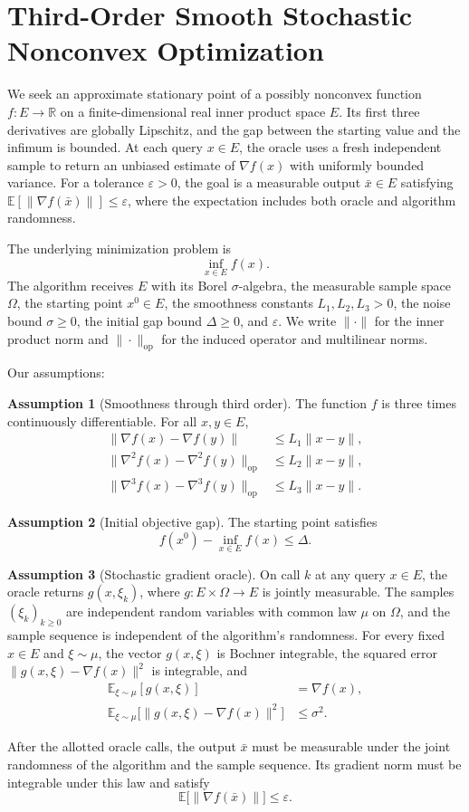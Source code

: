 \documentclass[10pt]{article}
\theoremstyle{definition}
\newtheorem{assumption}{Assumption}
\begin{document}
\section*{Third-Order Smooth Stochastic Nonconvex Optimization}
We seek an approximate stationary point of a possibly nonconvex function $f:E\to\mathbb{R}$ on a finite-dimensional real inner product space $E$. Its first three derivatives are globally Lipschitz, and the gap between the starting value and the infimum is bounded. At each query $x\in E$, the oracle uses a fresh independent sample to return an unbiased estimate of $\nabla f(x)$ with uniformly bounded variance. For a tolerance $\varepsilon>0$, the goal is a measurable output $\bar{x}\in E$ satisfying $\mathbb{E}[\|\nabla f(\bar{x})\|]\leq\varepsilon$, where the expectation includes both oracle and algorithm randomness.

The underlying minimization problem is
\[
\inf_{x\in E} f(x).
\]
The algorithm receives $E$ with its Borel $\sigma$-algebra, the measurable sample space $\Omega$, the starting point $x^0\in E$, the smoothness constants $L_1,L_2,L_3>0$, the noise bound $\sigma\geq 0$, the initial gap bound $\Delta\geq 0$, and $\varepsilon$. We write $\|\cdot\|$ for the inner product norm and $\|\cdot\|_{\mathrm{op}}$ for the induced operator and multilinear norms.

Our assumptions:
\begin{assumption}[Smoothness through third order]
The function $f$ is three times continuously differentiable. For all $x,y\in E$,
\[
\begin{aligned}
\|\nabla f(x)-\nabla f(y)\| &\leq L_1\|x-y\|,\\
\|\nabla^2 f(x)-\nabla^2 f(y)\|_{\mathrm{op}} &\leq L_2\|x-y\|,\\
\|\nabla^3 f(x)-\nabla^3 f(y)\|_{\mathrm{op}} &\leq L_3\|x-y\|.
\end{aligned}
\]
\end{assumption}

\begin{assumption}[Initial objective gap]
The starting point satisfies
\[
f(x^0)-\inf_{x\in E}f(x)\leq\Delta.
\]
\end{assumption}

\begin{assumption}[Stochastic gradient oracle]
On call $k$ at any query $x\in E$, the oracle returns $g(x,\xi_k)$, where $g:E\times\Omega\to E$ is jointly measurable. The samples $(\xi_k)_{k\geq 0}$ are independent random variables with common law $\mu$ on $\Omega$, and the sample sequence is independent of the algorithm's randomness. For every fixed $x\in E$ and $\xi\sim\mu$, the vector $g(x,\xi)$ is Bochner integrable, the squared error $\|g(x,\xi)-\nabla f(x)\|^2$ is integrable, and
\[
\begin{aligned}
\mathbb{E}_{\xi\sim\mu}[g(x,\xi)] &= \nabla f(x),\\
\mathbb{E}_{\xi\sim\mu}\bigl[\|g(x,\xi)-\nabla f(x)\|^2\bigr] &\leq \sigma^2.
\end{aligned}
\]
\end{assumption}

After the allotted oracle calls, the output $\bar{x}$ must be measurable under the joint randomness of the algorithm and the sample sequence. Its gradient norm must be integrable under this law and satisfy
\[
\mathbb{E}\bigl[\|\nabla f(\bar{x})\|\bigr]\leq\varepsilon.
\]
\end{document}
